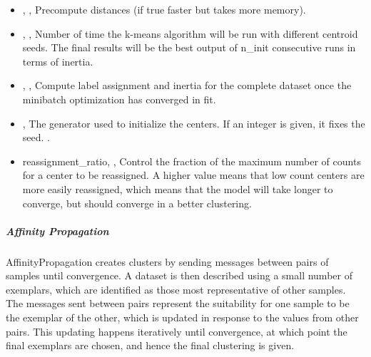 \begin{itemize}
	\item {}, , Precompute distances (if true faster but takes more memory).
	\item {}, ,
Number of time the k-means algorithm will be run with different centroid
 seeds. The final results will be the best output of n\_init consecutive
 runs in terms of inertia. 
	\item {}, ,
Compute label assignment and inertia for the complete dataset once the
 minibatch optimization has converged in fit. 
	\item {},  The generator used to initialize the centers. If an integer
 is given, it fixes the seed. .
	\item{reassignment\_ratio}, , Control
the fraction of the maximum number of counts for a center to be reassigned.
A higher value means that low count centers are more easily reassigned, which
 means that the model will take longer to converge, but should converge in a
better clustering. 
\end{itemize}

\subparagraph{Affinity Propagation} \hfill
\label{subparagraph:Affinity}

AffinityPropagation creates clusters by sending messages between pairs of
samples until convergence. A dataset is then described using a small number
of exemplars, which are identified as those most representative of other
samples. The messages sent between pairs represent the suitability for one
sample to be the exemplar of the other, which is updated in response to the
values from other pairs. This updating happens iteratively until convergence,
 at which point the final exemplars are chosen, and hence the final clustering
 is given.

